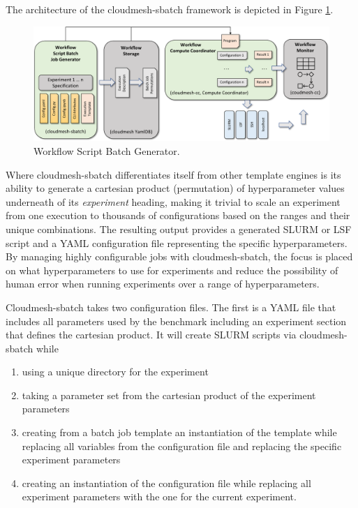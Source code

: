 \documentclass[utf8]{FrontiersinVancouver} %
\begin{document}
The architecture of the cloudmesh-sbatch framework is depicted in
Figure \ref{fig:cm-sbatch}.

\begin{figure}[htb]
    \centering
    \includegraphics[width=0.70\columnwidth]{images/cloudmesh-sbatch-new.pdf}
    \caption{Workflow Script Batch Generator.}
    \label{fig:cm-sbatch}
\end{figure}


Where cloudmesh-sbatch differentiates itself from other template engines is its
ability to generate a cartesian product  (permutation) of hyperparameter values
underneath of its {\it experiment} heading, making it trivial to
scale an experiment from one execution to thousands of configurations
based on the ranges and their unique combinations.  The resulting
output provides a generated SLURM or LSF script and a YAML
configuration file representing the specific hyperparameters.  By
managing highly configurable jobs with cloudmesh-sbatch, the focus is
placed on what hyperparameters to use for experiments and reduce the
possibility of human error when running experiments over a range of
hyperparameters.

Cloudmesh-sbatch takes two configuration files. The first is a YAML
file that includes all parameters used by the benchmark including an
experiment section that defines the cartesian product. It will 
create SLURM scripts via cloudmesh-sbatch while

\begin{enumerate}
  \item using a unique directory for the experiment
  \item taking a parameter set from the cartesian product
    of the experiment parameters
  \item creating from a batch job template an instantiation of the
    template while replacing all variables from the configuration file
    and replacing the specific experiment parameters
  \item creating an instantiation of the configuration file while replacing all experiment parameters with the one for the current experiment.
\end{enumerate}
\end{document}
